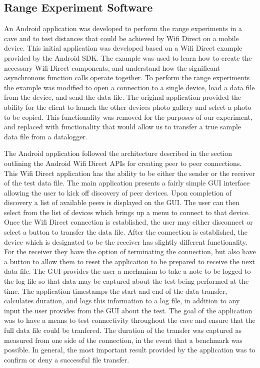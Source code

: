 \documentclass[10pt,twocolumn]{article}
\begin{document}
\subsection{Range Experiment Software}
An Android application was developed to perform the range experiments in a cave and to test distances that could be achieved by Wifi Direct on a mobile device.
This initial application was developed based on a Wifi Direct example provided by the Android SDK.
The example was used to learn how to create the necessary Wifi Direct components, and understand how the significant asynchronous function calls operate together.
To perform the range experiments the example was modified to open a connection to a single device, load a data file from the device, and send the data file. 
The original application provided the ability for the client to launch the other devices photo gallery and select a photo to be copied.
This functionality was removed for the purposes of our experiment, and replaced with functionality that would allow us to transfer a true sample data file from a datalogger.

The Android application followed the architecture described in the section outlining the Android Wifi Direct APIs for creating peer to peer connections. 
This Wifi Direct application has the ability to be either the sender or the receiver of the test data file.
The main application presents a fairly simple GUI interface allowing the user to kick off discovery of peer devices. 
Upon completion of discovery a list of available peers is displayed on the GUI.
The user can then select from the list of devices which brings up a menu to connect to that device.
Once the Wifi Direct connection is established, the user may either disconnect or select a button to transfer the data file.
After the connection is established, the device which is designated to be the receiver has slightly different functionality.
For the receiver they have the option of terminating the connection, but also have a button to allow them to reset the applicaiton to be prepared to receive the next data file.
The GUI provides the user a mechanism to take a note to be logged to the log file so that data may be captured about the test being performed at the time.
The application timestamps the start and end of the data transfer, calculates duration, and logs this information to a log file, in addition to any input the user provides from the GUI about the test.
The goal of the application was to have a means to test connectivity throughout the cave and ensure that the full data file could be tranfered.
The duration of the transfer was captured as measured from one side of the connection, in the event that a benchmark was possible.
In general, the most important result provided by the application was to confirm or deny a successful file transfer.
\end{document}
